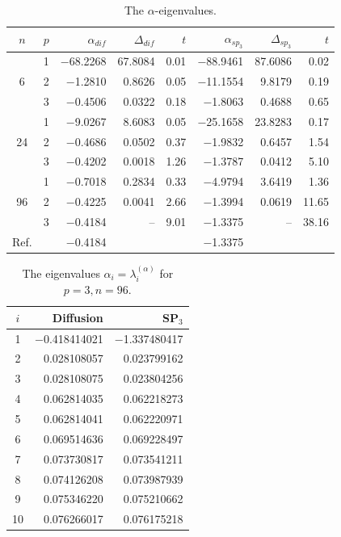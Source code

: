 \documentclass[a4paper]{jpconf}
\begin{document}
\begin{table}[h]
\caption{The $\alpha$-eigenvalues.}
\label{tab:iaea_with_alpha_del}
\begin{center}
\begin{tabular}{c c r r r r r r}
\hline
$n$ & $p$ & $\alpha_{dif}$ & $\Delta_{dif}$ &$t$ &$\alpha_{sp_3}$& $\Delta_{sp_3}$&$t$ \\
\hline
	& 1	&$-$68.2268 &67.8084& 0.01& $-$88.9461 &87.6086 &0.02\\
6	& 2	& $-$1.2810 & 0.8626& 0.05& $-$11.1554 & 9.8179 &0.19\\
	& 3	& $-$0.4506 & 0.0322& 0.18& $-$1.8063 & 0.4688 &0.65\\ 
\hline
	& 1	& $-$9.0267  & 8.6083& 0.05& $-$25.1658 &23.8283 &0.17\\
24& 2	& $-$0.4686  & 0.0502& 0.37& $-$1.9832 & 0.6457 &1.54\\
	& 3	& $-$0.4202  & 0.0018& 1.26& $-$1.3787 & 0.0412 &5.10\\ 
\hline
	& 1	& $-$0.7018  & 0.2834& 0.33& $-$4.9794 & 3.6419 &1.36\\
96& 2	& $-$0.4225  & 0.0041& 2.66& $-$1.3994 & 0.0619 &11.65\\
	& 3	& $-$0.4184  &    -- & 9.01& $-$1.3375 &    -- &38.16\\ 
\hline
Ref.&   & $-$0.4184  &       &     & $-$1.3375 \\ 
\hline
\end{tabular}
\end{center}
\end{table}

\begin{table}[h]
\caption{The eigenvalues $\alpha_i=\lambda_i^{(\alpha)}$ for $p=3, n=96$.}
\label{tab:iaea_with_alpha_del_10}
\begin{center}
\begin{tabular}{c r r}
\hline
$i$ & Diffusion & SP$_3$ \\
\hline
1& $-$0.418414021 &$-$1.337480417\\
2& 0.028108057    &   0.023799162\\
3& 0.028108075    &   0.023804256\\
4& 0.062814035    &   0.062218273\\
5& 0.062814041    &   0.062220971\\
6& 0.069514636    &   0.069228497\\
7& 0.073730817    &   0.073541211\\
8& 0.074126208    &   0.073987939\\
9& 0.075346220    &   0.075210662\\
10& 0.076266017   &   0.076175218\\
\hline
\end{tabular}
\end{center}
\end{table}
\end{document}
